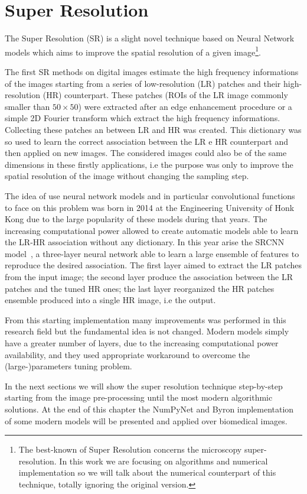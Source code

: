 \documentclass{standalone}
\begin{document}
\section[Super Resolution]{Super Resolution}\label{sr}

The Super Resolution (SR) is a slight novel technique based on Neural Network models which aims to improve the spatial resolution of a given image\footnote{
  The best-known  of Super Resolution concerns the microscopy super-resolution.
  In this work we are focusing on algorithms and numerical implementation so we will talk about the numerical counterpart of this technique, totally ignoring the original  version.
}.

The first SR methods on digital images estimate the high frequency informations of the images starting from a series of low-resolution (LR) patches and their high-resolution (HR) counterpart.
These patches (ROIs of the LR image commonly smaller than $50\times50$) were extracted after an edge enhancement procedure or a simple 2D Fourier transform which extract the high frequency informations.
Collecting these patches an  between LR and HR was created.
This dictionary was so used to learn the correct association between the LR e HR counterpart and then applied on new images.
The considered images could also be of the same dimensions in these firstly applications, i.e the purpose was only to improve the spatial resolution of the image without changing the sampling step.

The idea of use neural network models and in particular convolutional functions to face on this problem was born in 2014 at the Engineering University of Honk Kong due to the large popularity of these models during that years.
The increasing computational power allowed to create automatic models able to learn the LR-HR association without any dictionary.
In this year arise the SRCNN model~\cite{SRCNN}, a three-layer neural network able to learn a large ensemble of features to reproduce the desired association.
The first layer aimed to extract the LR patches from the input image; the second layer produce the association between the LR patches and the tuned HR ones; the last layer reorganized the HR patches ensemble produced into a single HR image, i.e the output.

From this starting implementation many improvements was performed in this research field but the fundamental idea is not changed.
Modern models simply have a greater number of layers, due to the increasing computational power availability, and they used appropriate workaround to overcome the (large-)parameters tuning problem.

In the next sections we will show the super resolution technique step-by-step starting from the image pre-processing until the most modern algorithmic solutions.
At the end of this chapter the NumPyNet and Byron implementation of some modern models will be presented and applied over biomedical images.

\end{document}

